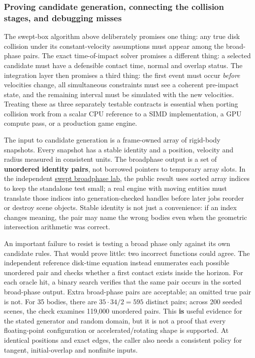 \subsubsection{Proving candidate generation, connecting the collision stages, and debugging misses}\label{04-visual-computing-ii-ch026-proving-candidate-generation-connecting-the-collision-stages-and-debugging-misses}

The swept-box algorithm above deliberately promises one thing: any true disk collision under its constant-velocity assumptions must appear among the broad-phase pairs. The exact time-of-impact solver promises a different thing: a selected candidate must have a defensible contact time, normal and overlap status. The integration layer then promises a third thing: the first event must occur \emph{before} velocities change, all simultaneous constraints must see a coherent pre-impact state, and the remaining interval must be simulated with the new velocities. Treating these as three separately testable contracts is essential when porting collision work from a scalar CPU reference to a SIMD implementation, a GPU compute pass, or a production game engine.

The input to candidate generation is a frame-owned array of rigid-body snapshots. Every snapshot has a stable identity and a position, velocity and radius measured in consistent units. The broadphase output is a set of \textbf{unordered identity pairs}, not borrowed pointers to temporary array slots. In the independent \href{../../tools/labs/swept_broadphase_lab.cpp}{swept broadphase lab}, the public result uses sorted array indices to keep the standalone test small; a real engine with moving entities must translate those indices into generation-checked handles before later jobs reorder or destroy scene objects. Stable identity is not just a convenience: if an index changes meaning, the pair may name the wrong bodies even when the geometric intersection arithmetic was correct.

An important failure to resist is testing a broad phase only against its own candidate rules. That would prove little: two incorrect functions could agree. The independent reference disk-time equation instead enumerates each possible unordered pair and checks whether a first contact exists inside the horizon. For each oracle hit, a binary search verifies that the same pair occurs in the sorted broad-phase output. Extra broad-phase pairs are acceptable; an omitted true pair is not. For 35 bodies, there are \(35\cdot34/2=595\) distinct pairs; across 200 seeded scenes, the check examines 119,000 unordered pairs. This \textbf{is} useful evidence for the stated generator and random domain, but it is not a proof that every floating-point configuration or accelerated/rotating shape is supported. At identical positions and exact edges, the caller also needs a consistent policy for tangent, initial-overlap and nonfinite inputs.

